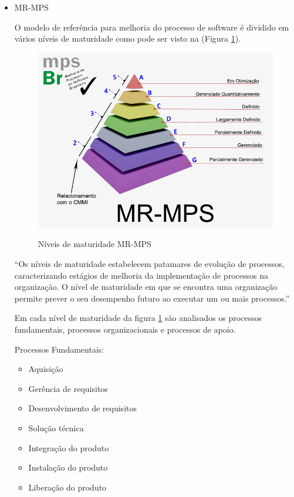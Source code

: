 \begin{itemize}

\item MR-MPS

O modelo de referência para melhoria do processo de software é dividido em vários níveis de maturidade como pode ser visto na (Figura \ref{img:MR-MPS2}).

\FloatBarrier
\begin{figure}[!htpd]
		\centering
		\includegraphics[scale=2.2]{figuras/MR-MPS2}
		\label{img:MR-MPS2}
		\caption{Níveis de maturidade MR-MPS}
\end{figure}
\FloatBarrier

“Os níveis de maturidade estabelecem patamares de evolução de processos, caracterizando estágios de melhoria da implementação de processos na organização. O nível de maturidade em que se encontra uma organização permite prever o seu desempenho futuro ao executar um ou mais processos.”  \cite{Silveira}

Em cada nível de maturidade da figura \ref{img:MR-MPS2}  são analisados os processos fundamentais, processos organizacionais e processos de apoio.

Processos Fundamentais:

\begin{itemize}
\item Aquisição
\item Gerência de requisitos
\item Desenvolvimento de requisitos
\item Solução técnica
\item Integração do produto
\item Instalação do produto
\item Liberação do produto
\end{itemize}


\end{itemize}
